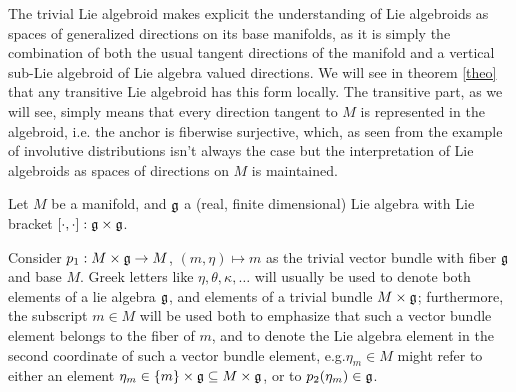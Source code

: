 The trivial Lie algebroid makes explicit the understanding of Lie algebroids as spaces of generalized directions on its base manifolds, as it is simply the combination of both the usual tangent directions of the manifold and a vertical sub-Lie algebroid of Lie algebra valued directions. We will see in theorem \ref{theo} that any transitive Lie algebroid has this form locally. The transitive part, as we will see, simply means that every direction tangent to $M$ is represented in the algebroid, i.e. the anchor is fiberwise surjective, which, as seen from the example of involutive distributions isn't always the case but the interpretation of Lie algebroids as spaces of directions on $M$ is maintained.

Let $M$ be a manifold, and $\mathfrak{g}$ a (real, finite dimensional) Lie algebra with Lie bracket $[\cdot , \cdot]: \mathfrak{g} \times \mathfrak{g}$.

Consider $p_1: M \times \mathfrak{g} \to M$, $(m, \eta) \mapsto m$ as the trivial vector bundle with fiber $\mathfrak{g}$ and base $M$. Greek letters like $\eta, \theta, \kappa, \dots$ will usually be used to denote both elements of a lie algebra $\mathfrak{g}$, and elements of a trivial bundle $M \times \mathfrak{g}$; furthermore, the subscript $m \in M$ will be used both to emphasize that such a vector bundle element belongs to the fiber of $m$, and to denote the Lie algebra element in the second coordinate of such a vector bundle element, e.g.$\eta_m \in M$ might refer to either an element $\eta_m \in \left\{ m \right\} \times \mathfrak{g} \subseteq M \times \mathfrak{g}$, or to $p_2(\eta_m) \in \mathfrak{g}$. %

